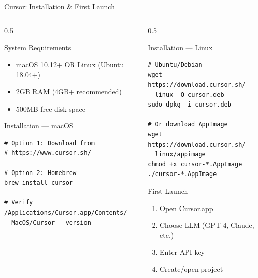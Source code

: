 \documentclass[aspectratio=169,11pt]{beamer}
\begin{document}
\begin{frame}[fragile]{Cursor: Installation \& First Launch}
    \begin{columns}[T]
        \begin{column}{0.5\textwidth}
            \begin{block}{System Requirements}
                \begin{itemize}
                    \item macOS 10.12+ OR Linux (Ubuntu 18.04+)
                    \item 2GB RAM (4GB+ recommended)
                    \item 500MB free disk space
                \end{itemize}
            \end{block}

            \begin{block}{Installation --- macOS}
                \begin{lstlisting}[style=bash]
# Option 1: Download from
# https://www.cursor.sh/

# Option 2: Homebrew
brew install cursor

# Verify
/Applications/Cursor.app/Contents/
  MacOS/Cursor --version
                \end{lstlisting}
            \end{block}
        \end{column}
        \begin{column}{0.5\textwidth}
            \begin{block}{Installation --- Linux}
                \begin{lstlisting}[style=bash]
# Ubuntu/Debian
wget https://download.cursor.sh/
  linux -O cursor.deb
sudo dpkg -i cursor.deb

# Or download AppImage
wget https://download.cursor.sh/
  linux/appimage
chmod +x cursor-*.AppImage
./cursor-*.AppImage
                \end{lstlisting}
            \end{block}

            \begin{exampleblock}{First Launch}
                \begin{enumerate}
                    \item Open Cursor.app
                    \item Choose LLM (GPT-4, Claude, etc.)
                    \item Enter API key
                    \item Create/open project
                \end{enumerate}
            \end{exampleblock}
        \end{column}
    \end{columns}

\end{frame}
\end{document}
